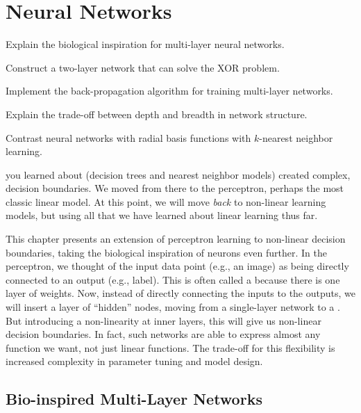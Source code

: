 \chapter{Neural Networks} \label{sec:nnet}


\begin{learningobjectives}
\item Explain the biological inspiration for multi-layer neural
  networks.
\item Construct a two-layer network that can solve the XOR problem.
\item Implement the back-propagation algorithm for training
  multi-layer networks.
\item Explain the trade-off between depth and breadth in network
  structure.
\item Contrast neural networks with radial basis functions with
  $k$-nearest neighbor learning.
\end{learningobjectives}

\dependencies{}

 you learned about (decision
trees and nearest neighbor models) created complex,
 decision boundaries.  We moved from there to the
perceptron, perhaps the most classic linear model.  At this point, we
will move \emph{back} to non-linear learning models, but using all
that we have learned about linear learning thus far.

This chapter presents an extension of perceptron learning to
non-linear decision boundaries, taking the biological inspiration of
neurons even further.  In the perceptron, we thought of the input data
point (e.g., an image) as being directly connected to an output (e.g.,
label).  This is often called a  because
there is one layer of weights.  Now, instead of directly connecting
the inputs to the outputs, we will insert a layer of ``hidden'' nodes,
moving from a single-layer network to a .
But introducing a non-linearity at inner layers, this will give us
non-linear decision boundaries.  In fact, such networks are able to
express almost any function we want, not just linear functions.  The
trade-off for this flexibility is increased complexity in parameter
tuning and model design.

\section{Bio-inspired Multi-Layer Networks}

